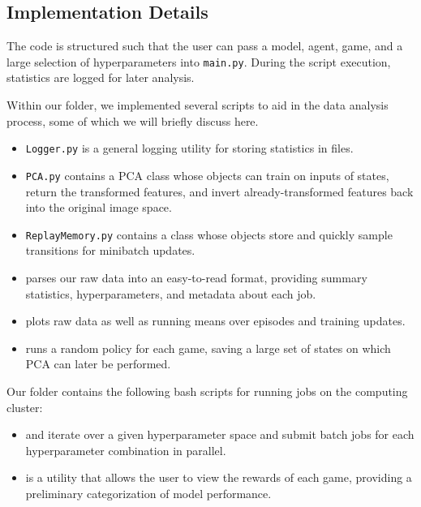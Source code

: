 \documentclass[11pt]{article}
\begin{document}
\subsection{Implementation Details}

The code is structured such that the user can pass a model, agent, game, and a large selection of hyperparameters into \texttt{main.py}. During the script execution, statistics are logged for later analysis. 

Within our  folder, we implemented several scripts to aid in the data analysis process, some of which we will briefly discuss here. 

\begin{itemize}
    \item \texttt{Logger.py} is a general logging utility for storing statistics in files. 
    \item \texttt{PCA.py} contains a PCA class whose objects can train on inputs of states, return the transformed features, and invert already-transformed features back into the original image space. 
    \item \texttt{ReplayMemory.py} contains a class whose objects store and quickly sample transitions for minibatch updates. 
    \item {} parses our raw data into an easy-to-read format, providing summary statistics, hyperparameters, and metadata about each job. 
    \item {} plots raw data as well as running means over episodes and training updates. 
    \item {} runs a random policy for each game, saving a large set of states on which PCA can later be performed. 
\end{itemize}
 
Our  folder contains the following bash scripts for running jobs on the computing cluster:

\begin{itemize}
    \item {} and  iterate over a given hyperparameter space and submit batch jobs for each hyperparameter combination in parallel.
    \item {} is a utility that allows the user to view the rewards of each game, providing a preliminary categorization of model performance. 
\end{itemize}
\end{document}
